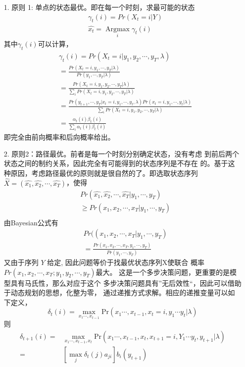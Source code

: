  \begin{enumerate}
 \item[1.]  原则 1:  单点的状态最优。即在每一个时刻，求最可能的状态
 $$
\begin{aligned}
 & \gamma_{t}(i)=Pr(X_{t}=i | Y)\\
 & \hat{x_{t}}=\mathop{\mbox{Argmax}}\limits_{i} \gamma_{t}(i)
\end{aligned}
$$
其中$\gamma_{t}(i)$可以计算，
$$
  \begin{aligned}
    & \gamma_{t}(i)=Pr(X_{t}=i | y_{1},y_{2},\cdots, y_{T},\lambda)\\
        &=\frac{Pr(X_{t}=i, y_{1},\cdots, y_{T} | \lambda)}{Pr(y_{1},\cdots, y_{T}| \lambda)}\\
        &=\frac{Pr(X_{t}=i, y_{1},y_{2},\cdots, y_{T}| \lambda)}{\sum\limits_{i}Pr(X_{t}=i, y_{1},y_{2},\cdots, y_{T} | \lambda)}\\
        &=\frac{Pr(y_{t+1},\cdots, y_{T} | x_{t}=i,y_{1},\cdots,y_{t},\lambda)Pr(x_{t}=i,y_{1},\cdots,y_{t} | \lambda)}{\sum\limits_{i}Pr(X_{t}=i, y_{1},y_{2},\cdots, y_{T} | \lambda)}\\
        &=\frac{\alpha_{t}(i)\beta_{t}(i)}{\sum\limits_{i}\alpha_{t}(i)\beta_{t}(i)}
  \end{aligned}
$$
即完全由前向概率和后向概率给出。

 \item[2.]   原则2：路径最优。前者是每一个时刻分别确定状态，没有考虑
到前后两个状态之间的制约关系，因此完全有可能得到的状态序列是不存在
的。基于这种原因，考虑路径最优的原则就是很自然的了。即选取状态序列
$\hat{X}=(\hat{x_{1}}, \hat{x_2},\cdots,\hat{x_T})$，使得
$$
\begin{aligned}
  & Pr(\hat{x_{1}}, \hat{x_2},\cdots,\hat{x_T} | y_{1},\cdots,y_{T})\\
  & \geq Pr ( x_{1},x_{2},\cdots,x_{T} | y_{1},\cdots,y_{T})\\
\end{aligned}
$$
由Bayesian公式有
$$
\begin{aligned}
  & Pr((x_1, x_2,\cdots,x_T | y_{1},\cdots,y_{T})\\
  & =\frac{Pr( x_1, x_2,\cdots,x_T, y_1,\cdots,y_T)}
      {Pr(y_{1},\cdots,y_{T})}
\end{aligned}
$$
又由于序列 $Y$ 给定, 因此问题等价于找最优状态序列X使联合
概率$Pr(x_1,x_2,\cdots,x_T;y_1,y_2,\cdots,y_T)$最大。
这是一个多步决策问题，更重要的是模型具有马氏性，那么对应于这个
多步决策问题具有”无后效性“，因此可以借助于动态规划的思想，化整为零，
通过递推方式求解。相应的递推变量可以如下定义，
$$
     \delta_{t}(i)=\max\limits_{x_{1}\cdots,x_{t-1}}
        \mbox{Pr}(x_{1}\cdots,x_{t-1},x_{t}=i,
  y_{1}\cdots y_{t}|\lambda)
   $$
则
 $$
\begin{aligned}
    \delta_{t+1}(i)=&\max\limits_{x_{1}\cdots,x_{t-1},x_{t} }
        \mbox{Pr}(x_{1}\cdots,x_{t-1},x_{t},x_{t+1}=i,
  Y_{1}\cdots y_{t}, y_{t+1}|\lambda)\\
      =&[\max\limits_{j}\delta_{t}(j) a_{ji}] b_{i}(y_{t+1})\\
\end{aligned}
$$


\end{enumerate}
